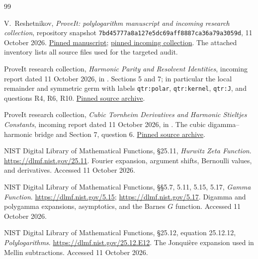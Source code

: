 \documentclass[11pt]{article}
\numberwithin{equation}{section}
\theoremstyle{plain}
\theoremstyle{definition}
\theoremstyle{remark}
\newcommand{\src}[1]{\nolinkurl{#1}}
\begin{document}
\begin{thebibliography}{99}

V.~Reshetnikov, \emph{ProveIt: polylogarithm manuscript and incoming
research collection}, repository snapshot
\texttt{7bd45777a8a127e5dc69aff8887ca36a79a3059d},
11 October 2026.
\href{https://github.com/VladimirReshetnikov/ProveIt/tree/7bd45777a8a127e5dc69aff8887ca36a79a3059d/Analysis/Polylogarithms/docs/manuscript}{Pinned manuscript};
\href{https://github.com/VladimirReshetnikov/ProveIt/tree/7bd45777a8a127e5dc69aff8887ca36a79a3059d/docs/incoming}{pinned incoming collection}.
The attached inventory lists all source files used for the targeted audit.

ProveIt research collection,
\emph{Harmonic Parity and Resolvent Identities},
incoming report dated 11 October 2026, in \cite{bhr:ProveIt}.
Sections 5 and 7; in particular the local remainder and symmetric
germ with labels \src{qtr:polar}, \src{qtr:kernel}, \src{qtr:J},
and questions R4, R6, R10.
\href{https://github.com/VladimirReshetnikov/ProveIt/blob/7bd45777a8a127e5dc69aff8887ca36a79a3059d/docs/incoming/ProveIt_Harmonic_Parity_and_Resolvent_Identities_2026-10-11.zip}{Pinned source archive}.

ProveIt research collection,
\emph{Cubic Tornheim Derivatives and Harmonic Stieltjes Constants},
incoming report dated 11 October 2026, in \cite{bhr:ProveIt}.
The cubic digamma--harmonic bridge and Section 7, question 6.
\href{https://github.com/VladimirReshetnikov/ProveIt/blob/7bd45777a8a127e5dc69aff8887ca36a79a3059d/docs/incoming/ProveIt_Cubic_Harmonic_Mixed_Orders_2026-10-11.zip}{Pinned source archive}.

NIST Digital Library of Mathematical Functions,
\S25.11, \emph{Hurwitz Zeta Function}.
\url{https://dlmf.nist.gov/25.11}.
Fourier expansion, argument shifts, Bernoulli values, and derivatives.
Accessed 11 October 2026.

NIST Digital Library of Mathematical Functions,
\S\S5.7, 5.11, 5.15, 5.17, \emph{Gamma Function}.
\url{https://dlmf.nist.gov/5.15};
\url{https://dlmf.nist.gov/5.17}.
Digamma and polygamma expansions, asymptotics, and the Barnes $G$ function.
Accessed 11 October 2026.

NIST Digital Library of Mathematical Functions,
\S25.12, equation 25.12.12, \emph{Polylogarithms}.
\url{https://dlmf.nist.gov/25.12.E12}.
The Jonqui\`ere expansion used in Mellin subtractions.
Accessed 11 October 2026.


\end{thebibliography}
\end{document}
